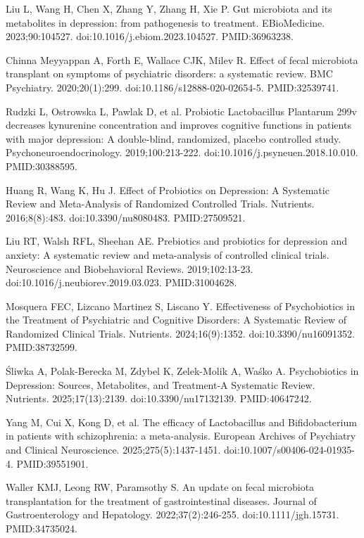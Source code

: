 \documentclass[12pt,oneside]{book}
\newcommand{\reff}[2]{\par\hangindent=7mm\hangafter=1\noindent[#1]\hspace{2mm}#2\par}
\begin{document}
\reff{41}{Liu L, Wang H, Chen X, Zhang Y, Zhang H, Xie P. Gut microbiota and its metabolites in depression: from pathogenesis to treatment. EBioMedicine. 2023;90:104527. doi:10.1016/j.ebiom.2023.104527. PMID:36963238.}

\reff{42}{Chinna Meyyappan A, Forth E, Wallace CJK, Milev R. Effect of fecal microbiota transplant on symptoms of psychiatric disorders: a systematic review. BMC Psychiatry. 2020;20(1):299. doi:10.1186/s12888-020-02654-5. PMID:32539741.}

\reff{43}{Rudzki L, Ostrowska L, Pawlak D, et al. Probiotic Lactobacillus Plantarum 299v decreases kynurenine concentration and improves cognitive functions in patients with major depression: A double-blind, randomized, placebo controlled study. Psychoneuroendocrinology. 2019;100:213-222. doi:10.1016/j.psyneuen.2018.10.010. PMID:30388595.}

\reff{44}{Huang R, Wang K, Hu J. Effect of Probiotics on Depression: A Systematic Review and Meta-Analysis of Randomized Controlled Trials. Nutrients. 2016;8(8):483. doi:10.3390/nu8080483. PMID:27509521.}

\reff{45}{Liu RT, Walsh RFL, Sheehan AE. Prebiotics and probiotics for depression and anxiety: A systematic review and meta-analysis of controlled clinical trials. Neuroscience and Biobehavioral Reviews. 2019;102:13-23. doi:10.1016/j.neubiorev.2019.03.023. PMID:31004628.}

\reff{46}{Mosquera FEC, Lizcano Martinez S, Liscano Y. Effectiveness of Psychobiotics in the Treatment of Psychiatric and Cognitive Disorders: A Systematic Review of Randomized Clinical Trials. Nutrients. 2024;16(9):1352. doi:10.3390/nu16091352. PMID:38732599.}

\reff{47}{Śliwka A, Polak-Berecka M, Zdybel K, Zelek-Molik A, Waśko A. Psychobiotics in Depression: Sources, Metabolites, and Treatment-A Systematic Review. Nutrients. 2025;17(13):2139. doi:10.3390/nu17132139. PMID:40647242.}

\reff{48}{Yang M, Cui X, Kong D, et al. The efficacy of Lactobacillus and Bifidobacterium in patients with schizophrenia: a meta-analysis. European Archives of Psychiatry and Clinical Neuroscience. 2025;275(5):1437-1451. doi:10.1007/s00406-024-01935-4. PMID:39551901.}

\reff{49}{Waller KMJ, Leong RW, Paramsothy S. An update on fecal microbiota transplantation for the treatment of gastrointestinal diseases. Journal of Gastroenterology and Hepatology. 2022;37(2):246-255. doi:10.1111/jgh.15731. PMID:34735024.}
\end{document}

